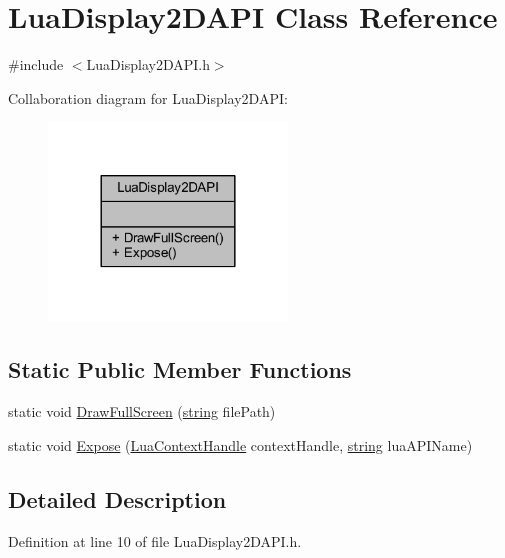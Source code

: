 \hypertarget{class_lua_display2_d_a_p_i}{}\section{Lua\+Display2\+D\+A\+PI Class Reference}
\label{class_lua_display2_d_a_p_i}


{\ttfamily \#include $<$Lua\+Display2\+D\+A\+P\+I.\+h$>$}



Collaboration diagram for Lua\+Display2\+D\+A\+PI\+:\nopagebreak
\begin{figure}[H]
\begin{center}
\leavevmode
\includegraphics[width=180pt]{class_lua_display2_d_a_p_i__coll__graph}
\end{center}
\end{figure}
\subsection*{Static Public Member Functions}
\begin{DoxyCompactItemize}
\item 
static void \hyperlink{class_lua_display2_d_a_p_i_a766e83bd46fa7810acec8f6b079709f0}{Draw\+Full\+Screen} (\hyperlink{_types_8h_ad453f9f71ce1f9153fb748d6bb25e454}{string} file\+Path)
\item 
static void \hyperlink{class_lua_display2_d_a_p_i_ae59a06b7f6ca4d45c449e9defb166efb}{Expose} (\hyperlink{_lua_context_8h_a2ffcc2d3ed21165072a1d7b61259bf14}{Lua\+Context\+Handle} context\+Handle, \hyperlink{_types_8h_ad453f9f71ce1f9153fb748d6bb25e454}{string} lua\+A\+P\+I\+Name)
\end{DoxyCompactItemize}


\subsection{Detailed Description}


Definition at line 10 of file Lua\+Display2\+D\+A\+P\+I.\+h.




